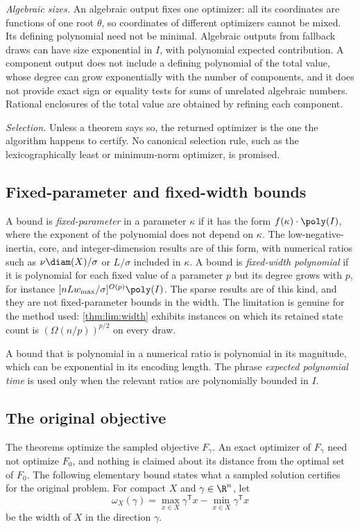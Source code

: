 \emph{Algebraic sizes.} An algebraic output fixes one optimizer: all its
coordinates are functions of one root $\theta$, so coordinates of different
optimizers cannot be mixed. Its defining polynomial need not be minimal.
Algebraic outputs from fallback draws can have size exponential in $I$, with
polynomial expected contribution. A component output does not include a
defining polynomial of the total value, whose degree can grow exponentially
with the number of components, and it does not provide exact sign or
equality tests for sums of unrelated algebraic numbers. Rational
enclosures of the total value are obtained by refining each component.

\emph{Selection.} Unless a theorem says so, the returned optimizer is the
one the algorithm happens to certify. No canonical selection rule, such as
the lexicographically least or minimum-norm optimizer, is promised.

\subsection{Fixed-parameter and fixed-width bounds}\label{sec:model:parameters}

A bound is \emph{fixed-parameter} in a parameter $\kappa$ if it has the form
$f(\kappa)\cdot\poly(I)$, where the exponent of the polynomial does not
depend on $\kappa$. The low-negative-inertia, core, and integer-dimension
results are of this form, with numerical ratios such as
$\nu\diam(X)/\sigma$ or $L/\sigma$ included in $\kappa$. A bound is
\emph{fixed-width polynomial} if it is polynomial for each fixed value of a
parameter $p$ but its degree grows with $p$, for instance
$[nLw_{\max}/\sigma]^{O(p)}\poly(I)$. The sparse results are of this kind,
and they are not fixed-parameter bounds in the width. The limitation is
genuine for the method used: \cref{thm:lim:width} exhibits instances on
which its retained state count is $(\Omega(n/p))^{p/2}$ on every draw.

A bound that is polynomial in a numerical ratio is polynomial in its
magnitude, which can be exponential in its encoding length. The phrase
\emph{expected polynomial time} is used only when the relevant ratios are
polynomially bounded in $I$.

\subsection{The original objective}\label{sec:model:original}

The theorems optimize the sampled objective $F_\gamma$. An exact optimizer
of $F_\gamma$ need not optimize $F_0$, and nothing is claimed about its
distance from the optimal set of $F_0$. The following elementary bound states
what a sampled solution certifies for the original problem. For compact $X$
and $\gamma\in\R^n$, let
\[
 \omega_X(\gamma)=\max_{x\in X}\gamma^{\mathsf T}x-\min_{x\in X}\gamma^{\mathsf T}x
\]
be the width of $X$ in the direction $\gamma$.

